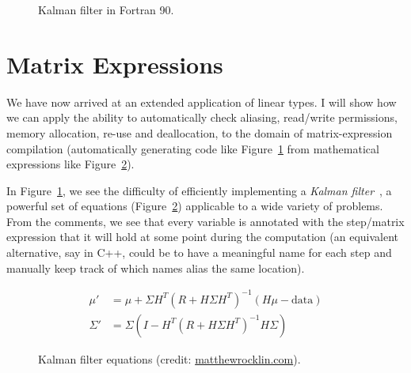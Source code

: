 \begin{landscape}
    \begin{figure}[p]
    \centering
    \begin{minipage}{1.47\textheight}
    \inputminted[linenos, fontsize=\footnotesize]{fortran}{kalman.f90}
    \end{minipage}
    \caption{Kalman filter in Fortran 90.}\label{fig:fortran_kalman}
    \end{figure}
\end{landscape}

\section{Matrix Expressions}\label{sec:matrix_exps}

We have now arrived at an extended application of linear types. I will show how
we can apply the ability to automatically check aliasing, read/write
permissions, memory allocation, re-use and deallocation, to the domain of
matrix-expression compilation (automatically generating code like
Figure~\ref{fig:fortran_kalman} from mathematical expressions like
Figure~\ref{fig:maths_kalman}).

In Figure~\ref{fig:fortran_kalman}, we see the difficulty of efficiently
implementing a \emph{Kalman filter}~\cite{kalman}, a powerful set of equations
(Figure~\ref{fig:maths_kalman}) applicable to a wide variety of problems. From
the comments, we see that every variable is annotated with the step/matrix
expression that it will hold at some point during the computation (an
equivalent alternative, say in C++, could be to have a meaningful name for each
step and manually keep track of which names alias the same location).

\begin{figure}[tp]
    \begin{align*}
        \mu' &= \mu + \Sigma H^T (R + H \Sigma H^T)^{-1} (H \mu - \textrm{data})\\
        \Sigma' &= \Sigma ( I - H^T (R + H \Sigma H^T)^{-1} H \Sigma )
    \end{align*}
    \caption{Kalman filter equations (credit:
    \href{http://matthewrocklin.com/blog/work/2012/11/24/Kalman-Filter}{matthewrocklin.com}).}\label{fig:maths_kalman}
\end{figure}

